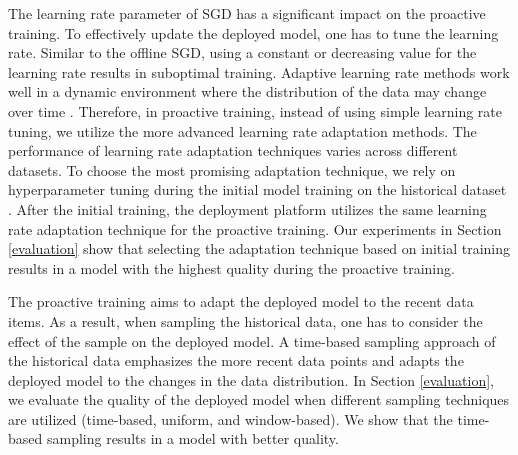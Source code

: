 The learning rate parameter of SGD has a significant impact on the proactive training.
To effectively update the deployed model, one has to tune the learning rate.
Similar to the offline SGD, using a constant or decreasing value for the learning rate results in suboptimal training.
Adaptive learning rate methods work well in a dynamic environment where the distribution of the data may change over time \cite{zeiler2012adadelta}.
Therefore, in proactive training, instead of using simple learning rate tuning, we utilize the more advanced learning rate adaptation methods.
The performance of learning rate adaptation techniques varies across different datasets.
To choose the most promising adaptation technique, we rely on hyperparameter tuning during the initial model training on the historical dataset \cite{bergstra2012random}.
After the initial training, the deployment platform utilizes the same learning rate adaptation technique for the proactive training.
Our experiments in Section \ref{evaluation} show that selecting the adaptation technique based on initial training results in a model with the highest quality during the proactive training.

The proactive training aims to adapt the deployed model to the recent data items.
As a result, when sampling the historical data, one has to consider the effect of the sample on the deployed model.
A time-based sampling approach of the historical data emphasizes the more recent data points and adapts the deployed model to the changes in the data distribution.
In Section \ref{evaluation}, we evaluate the quality of the deployed model when different sampling techniques are utilized (time-based, uniform, and window-based).
We show that the time-based sampling results in a model with better quality.



